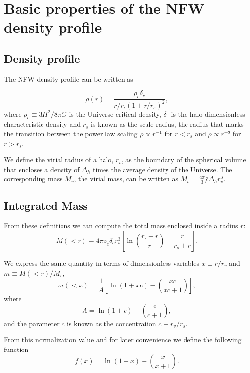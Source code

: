 \documentclass[useAMS,usenatbib]{mn2e}
\begin{document}
\section{Basic properties of the NFW density profile}
\label{sec:basics}

\subsection{Density profile}

The NFW density profile can be written as

\begin{equation}
\rho(r) = \frac{\rho_c\delta_c}{r/r_s(1+r/r_s)^2},
\label{eq:definition}
\end{equation}
%
where $\rho_c\equiv 3H^2/8\pi G$ is the Universe critical density,
$\delta_c$ is the halo dimensionless characteristic density and $r_s$
is known as the scale radius, the radius that marks the transition
between the power law scaling $\rho\propto r^{-1}$ for
$r<r_s$ and $\rho\propto r^{-3}$ for  $r>r_s$.

We define the virial radius of a halo, $r_v$, as the boundary of the
spherical volume that encloses a density of $\Delta_h$ times
the average density of the Universe. The corresponding mass $M_{v}$,
the virial mass, can be written as $M_{v} =
\frac{4\pi}{3}\bar{\rho}\Delta_h r_v^3$.


\subsection{Integrated Mass}
From these definitions we can compute the total mass enclosed inside a
radius $r$:
\begin{equation}
M(<r) = 4\pi\rho_c\delta_c  r_s^3\left[\ln \left
  (\frac{r_s+r}{r}\right) - \frac{r}{r_s+r}\right].
\end{equation}

We express the same quantity in terms of dimensionless
variables $x\equiv r/r_v$ and $m\equiv M(<r)/M_v$,
%
\begin{equation}
m(<x) =
\frac{1}{A}\left[\ln\left(1+xc\right)-\left(\frac{xc}{xc+1}\right)\right],
\label{eq:profile}
\end{equation}
%
where
%
\begin{equation}
A=\ln\left(1+c\right)-\left(\frac{c}{c+1}\right),
\end{equation}
%
and the parameter $c$ is known as the concentration $c\equiv r_v/r_s$.

From this normalization value and for later convenience we define the
following function
%
\begin{equation}
f(x) = \ln\left(1+x\right)-\left(\frac{x}{x+1}\right).
\label{eq:f_NFW}
\end{equation}
%
\end{document}
